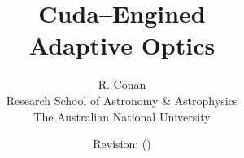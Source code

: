 \documentclass[a4paper]{ceo}
\begin{document}
\title{{\Huge\bf C}uda--{\Huge\bf E}ngined\\Adaptive {\Huge\bf O}ptics}
\author{R. Conan\\\small Research School of Astronomy \& Astrophysics\\\small The Australian National University}
\date{Revision\gitVtags\gitReferences: \gitAbbrevHash{} (\gitAuthorDate)}

\maketitle

\tableofcontents





\end{document}

